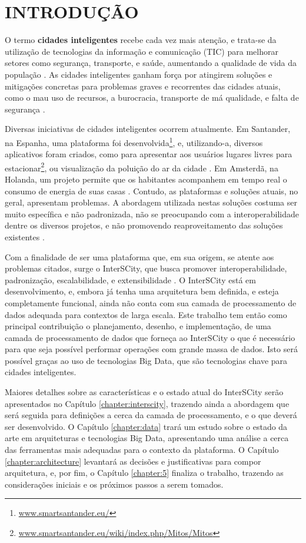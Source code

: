 \chapter[INTRODUÇÃO]{INTRODUÇÃO}
\label{chapter:intro}

O termo \textbf{cidades inteligentes} recebe cada vez mais atenção, e trata-se
da utilização de tecnologias da informação e comunicação (TIC) para melhorar
setores como segurança, transporte, e saúde, aumentando a qualidade de vida
da população \cite{batty2012smart}. As cidades inteligentes ganham força por
atingirem soluções e mitigações concretas para problemas graves e recorrentes
das cidades atuais, como o mau uso de recursos, a burocracia, transporte de má
qualidade, e falta de segurança \cite{batty2012smart}.

Diversas iniciativas de cidades inteligentes ocorrem atualmente. Em Santander,
na Espanha, uma plataforma foi
desenvolvida\footnote{\url{www.smartsantander.eu/}}, e, utilizando-a,
diversos aplicativos foram criados, como para apresentar aos usuários lugares
livres para estacionar\footnote{\url{www.smartsantander.eu/wiki/index.php/Mitos/Mitos}},
ou visualização da poluição do ar da cidade \cite{santana2016software}. Em
Amsterdã, na Holanda, um projeto permite que os habitantes acompanhem em tempo
real o consumo de energia de suas casas \cite{kon2016}. Contudo, as plataformas
e soluções atuais, no geral, apresentam problemas. A abordagem utilizada nestas
soluções costuma ser muito específica e não padronizada, não se preocupando com
a interoperabilidade dentre os diversos projetos, e não promovendo
reaproveitamento das soluções existentes \cite{delesposte2017}.

Com a finalidade de ser uma plataforma que, em sua origem, se atente aos
problemas citados, surge o InterSCity, que busca promover interoperabilidade,
padronização, escalabilidade, e extensibilidade \cite{delesposte2017}. O
InterSCity está em desenvolvimento, e, embora já tenha uma arquitetura bem
definida, e esteja completamente funcional, ainda não conta com sua camada de
processamento de dados adequada para contextos de larga escala. Este trabalho
tem então como principal contribuição o planejamento, desenho, e implementação,
de uma camada de processamento de dados que forneça ao InterSCity o que é
necessário para que seja possível performar operações com grande massa de dados.
Isto será possível graças ao uso de tecnologias Big Data, que são tecnologias
chave para cidades inteligentes\cite{batty2012smart}.

Maiores detalhes sobre as características e o estado atual do InterSCity serão
apresentados no Capítulo \ref{chapter:interscity}, trazendo ainda a abordagem que será
seguida para definições a cerca da camada de processamento, e o que deverá ser
desenvolvido. O Capítulo \ref{chapter:data} trará um estudo sobre o estado da arte
em arquiteturas e tecnologias Big Data, apresentando uma análise a cerca das
ferramentas mais adequadas para o contexto da plataforma. O Capítulo
\ref{chapter:architecture} levantará as decisões e justificativas para compor
arquitetura, e, por fim, o Capítulo \ref{chapter:5} finaliza o trabalho,
trazendo as considerações iniciais e os próximos passos a serem tomados.
